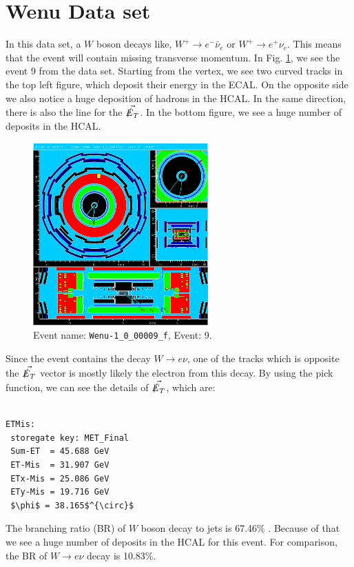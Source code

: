 \documentclass[a4paper]{report}
\numberwithin{equation}{section}
\begin{document}
\section{Wenu Data set}

In this data set, a $W$ boson decays like, $W^+ \rightarrow e^- \bar{\nu}_e$ or $W^+ \rightarrow e^+ \nu_e$. This means that the event will contain missing transverse momentum. In Fig. \ref{fig:wenu}, we see the event 9 from the data set. Starting from the vertex, we see two curved tracks in the top left figure, which deposit their energy in the ECAL. On the opposite side we also notice a huge deposition of hadrons in the HCAL. In the same direction, there is also the line for the $\vec{\slashed{E}_T}$. In the bottom figure, we see a huge number of deposits in the HCAL. 

\begin{figure}[htpb]
    \centering
    \includegraphics[width=0.6\textwidth]{Wenu-1_0_00009_f-YX-RZ-RZ-YX-2022-05-23-13-13-30}
    \caption{Event name: \texttt{Wenu-1\_0\_00009\_f}, Event: 9.}
    \label{fig:wenu}
\end{figure}

Since the event contains the decay $W \rightarrow e \nu$, one of the tracks which is opposite the $\vec{\slashed{E}_T}$ vector is mostly likely the electron from this decay. By using the pick function, we can see the details of $\vec{\slashed{E}_T}$, which are:

\begin{lstlisting}

ETMis:
 storegate key: MET_Final
 Sum-ET  = 45.688 GeV
 ET-Mis  = 31.907 GeV
 ETx-Mis = 25.086 GeV
 ETy-Mis = 19.716 GeV
 $\phi$ = 38.165$^{\circ}$
\end{lstlisting}
The branching ratio (BR) of $W$ boson decay to jets is 67.46\% \cite{CMS:2022mhs}. Because of that we see a huge number of deposits in the HCAL for this event. For comparison, the BR of $W \rightarrow e \nu$ decay is 10.83\%. 
\end{document}
